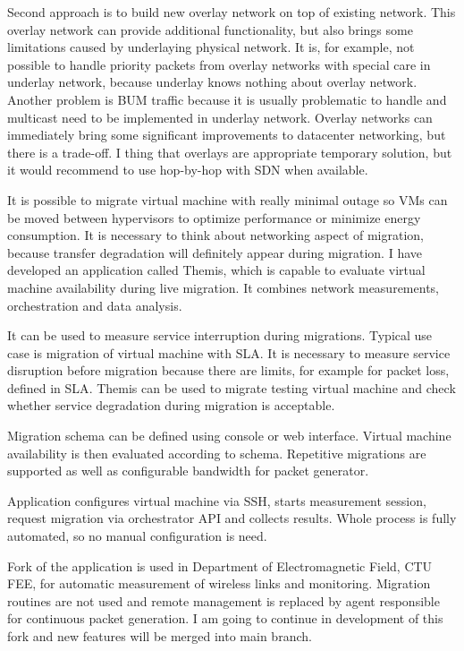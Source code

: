 Second approach is to build new overlay network on top of existing network. This overlay network can provide additional functionality, but also brings some limitations caused by underlaying physical network. It is, for example, not possible to handle priority packets from overlay networks with special care in underlay network, because underlay knows nothing about overlay network. Another problem is \Ac{BUM} traffic because it is usually problematic to handle and multicast need to be implemented in underlay network.
Overlay networks can immediately bring some significant improvements to datacenter networking, but there is a trade-off. I thing that overlays are appropriate temporary solution, but it would recommend to use hop-by-hop with \Ac{SDN} when available.

It is possible to migrate virtual machine with really minimal outage so \Ac{VM}s can be moved between hypervisors to optimize performance or minimize energy consumption. It is necessary to think about networking aspect of migration, because transfer degradation will definitely appear during migration. I have developed an application called Themis, which is capable to evaluate virtual machine availability during live migration. It combines network measurements, orchestration and data analysis.

It can be used to measure service interruption during migrations. Typical use case is migration of virtual machine with \Ac{SLA}. It is necessary to measure service disruption before migration because there are limits, for example for packet loss, defined in \Ac{SLA}. Themis can be used to migrate testing virtual machine and check whether service degradation during migration is acceptable.

Migration schema can be defined using console or web interface. Virtual machine availability is then evaluated according to schema. Repetitive migrations are supported as well as configurable bandwidth for packet generator. 


Application configures virtual machine via \Ac{SSH}, starts measurement session, request migration via orchestrator \Ac{API} and collects results. Whole process is fully automated, so no manual configuration is need. 





Fork of the application is used in Department of Electromagnetic Field, CTU FEE, for automatic measurement of wireless links and monitoring. Migration routines are not used and remote management is replaced by agent responsible for continuous packet generation. I am going to continue in development of this fork and new features will be merged into main branch.

